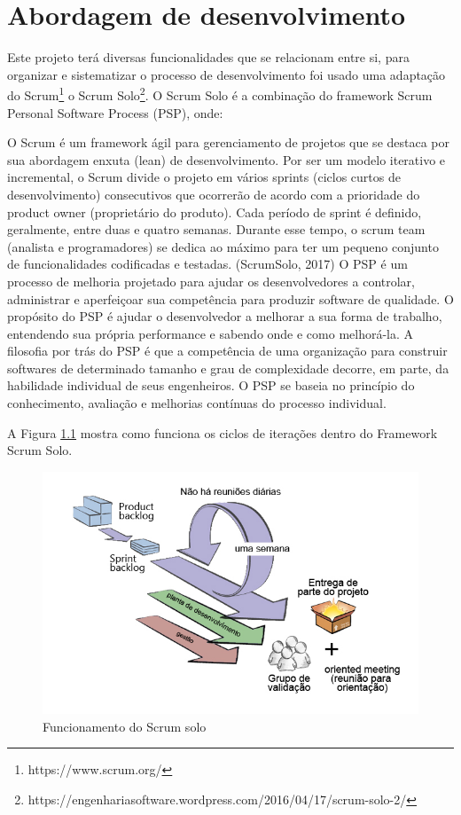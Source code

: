 \chapter{Abordagem de desenvolvimento}

Este projeto terá diversas funcionalidades que se relacionam entre si, para organizar e sistematizar o processo de desenvolvimento foi usado uma adaptação do Scrum\footnote{https://www.scrum.org/} o Scrum Solo\footnote{https://engenhariasoftware.wordpress.com/2016/04/17/scrum-solo-2/}. O Scrum Solo é a combinação do framework Scrum Personal Software Process (PSP), onde:

\begin{citacao}
O Scrum é um framework ágil para gerenciamento de projetos que se destaca por sua abordagem enxuta (lean) de desenvolvimento. Por ser um modelo iterativo e incremental, o Scrum divide o projeto em vários sprints (ciclos curtos de desenvolvimento) consecutivos que ocorrerão de acordo com a prioridade do product owner (proprietário do produto). Cada período de sprint é definido, geralmente, entre duas e quatro semanas. Durante esse tempo, o scrum team (analista e programadores) se dedica ao máximo para ter um pequeno conjunto de funcionalidades codificadas e testadas. (ScrumSolo, 2017) O PSP é um processo de melhoria projetado para ajudar os desenvolvedores a controlar, administrar e aperfeiçoar sua competência para produzir software de qualidade. O propósito do PSP é ajudar o desenvolvedor a melhorar a sua forma de trabalho, entendendo sua própria performance e sabendo onde e como melhorá-la. A filosofia por trás do PSP é que a competência de uma organização para construir softwares de determinado tamanho e grau de complexidade decorre, em parte, da habilidade individual de seus engenheiros. O PSP se baseia no princípio do conhecimento, avaliação e melhorias contínuas do processo individual. \cite{ScrumSolo2017}
\end{citacao}

A Figura \ref{scrum} mostra como funciona os ciclos de iterações dentro do Framework Scrum Solo.

\begin{figure}[H]
\caption{\label{scrum} Funcionamento do Scrum solo}
\includegraphics[scale=0.33]{img/scrum-solo.png}
\end{figure}

